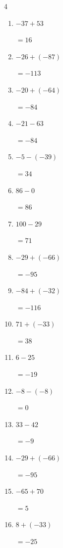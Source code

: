 \begin{multicols}{4}
\begin{enumerate}
        $=-25$

  \item $-37+53$

        $=16$

  \item $-26+(-87)$

        $=-113$

  \item $-20+(-64)$

        $=-84$

  \item $-21-63$

        $=-84$

  \item $-5-(-39)$

        $=34$

  \item $86-0$

        $=86$

  \item $100-29$

        $=71$

  \item $-29+(-66)$

        $=-95$

  \item $-84+(-32)$

        $=-116$

  \item $71+(-33)$

        $=38$

  \item $6-25$

        $=-19$

  \item $-8-(-8)$

        $=0$

  \item $33-42$

        $=-9$

  \item $-29+(-66)$

        $=-95$

  \item $-65+70$

        $=5$

  \item $8+(-33)$

        $=-25$

\columnbreak %

\resetques


\end{enumerate}
\end{multicols}
